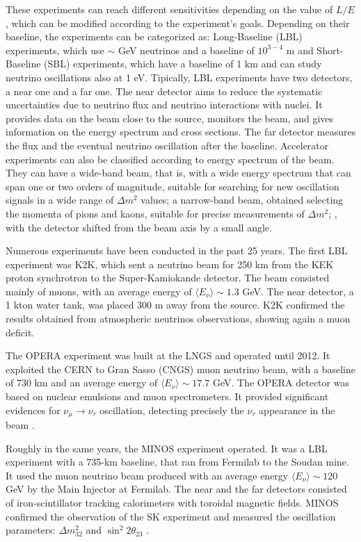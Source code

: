These experiments can reach different sensitivities depending on the value of $L/E$, which can be modified according to the experiment's goals. Depending on their baseline, the experiments can be categorized as: Long-Baseline (LBL) experiments, which use $\sim$ GeV neutrinos and a baseline of $10^{3-4}$ m and Short-Baseline (SBL) experiments, which have a baseline of 1 km and can study neutrino oscillations also at 1 eV. Tipically, LBL experiments have two detectors, a near one and a far one. The near detector aims to reduce the systematic uncertainties due to neutrino flux and neutrino interactions with nuclei. It provides data on the beam close to the source, monitors the beam, and gives information on the energy spectrum and cross sections. The far detector measures the flux and the eventual neutrino oscillation after the baseline. Accelerator experiments can also be classified according to energy spectrum of the beam. They can have a wide-band beam, that is, with a wide energy spectrum that can span one or two orders of magnitude, suitable for searching for new oscillation signals in a wide range of $\Delta m^2$ values; a narrow-band beam, obtained selecting the momenta of pions and kaons, suitable for precise measurements of $\Delta m^2$; , with the detector shifted from the beam axis by a small angle.

Numerous experiments have been conducted in the past 25 years. The first LBL experiment was K2K, which sent a neutrino beam for 250 km from the KEK proton synchrotron to the Super-Kamiokande detector. The beam consisted mainly of muons, with an average energy of $\langle E_\nu \rangle \sim 1.3$ GeV. The near detector, a 1 kton water tank, was placed 300 m away from the source. K2K confirmed the results obtained from atmospheric neutrinos observations, showing again a muon deficit. 

The OPERA experiment was built at the LNGS and operated until 2012. It exploited the CERN to Gran Sasso (CNGS) muon neutrino beam, with a baseline of 730 km and an average energy of $\langle E_\nu \rangle \sim 17.7$ GeV. The OPERA detector was based on nuclear emulsions and muon spectrometers. It provided significant evidences for $\nu_\mu \rightarrow \nu_\tau$ oscillation, detecting precisely the $\nu_\tau$ appearance in the beam \cite{OPERA}. 

Roughly in the same years, the MINOS experiment operated. It was a LBL experiment with a 735-km baseline, that ran from Fermilab to the Soudan mine. It used the muon neutrino beam produced with an average energy $\langle E_\nu \rangle \sim 120 $ GeV by the Main Injector at Fermilab. The near and the far detectors consisted of iron-scintillator tracking calorimeters with toroidal magnetic fields. MINOS confirmed the observation of the SK experiment and measured the oscillation parameters: $\Delta m^2_{32}$ and $\sin^2 2\theta_{23}$ \cite{MINOS}. 

